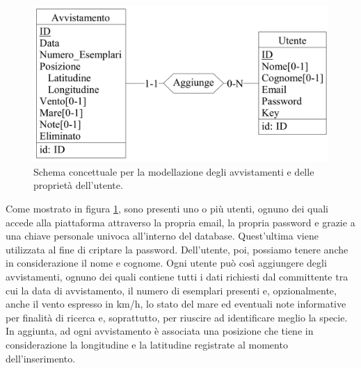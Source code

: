 \documentclass[a4paper,final,12pt]{report}
\begin{document}
\begin{figure}[hbtp]
\centering
\includegraphics[scale=0.15]{img_concettuale/avvistamento1.png}
\caption{Schema concettuale per la modellazione degli avvistamenti e delle proprietà dell'utente.}
\label{figura:sUtenteAvv}
\end{figure}

Come mostrato in figura \ref{figura:sUtenteAvv}, sono presenti uno o più utenti, ognuno dei quali accede alla piattaforma attraverso la propria email, la propria password e grazie a una chiave personale univoca all'interno del database. Quest'ultima viene utilizzata al fine di criptare la password. Dell'utente, poi, possiamo tenere anche in considerazione il nome e cognome.
Ogni utente può così aggiungere degli avvistamenti, ognuno dei quali contiene tutti i dati richiesti dal committente tra cui la data di avvistamento, il numero di esemplari presenti e, opzionalmente, anche il vento espresso in km/h, lo stato del mare ed eventuali note informative per finalità di ricerca e, soprattutto, per riuscire ad identificare meglio la specie.\\
In aggiunta, ad ogni avvistamento è associata una posizione che tiene in considerazione la longitudine e la latitudine  registrate al momento dell'inserimento.
\end{document}
